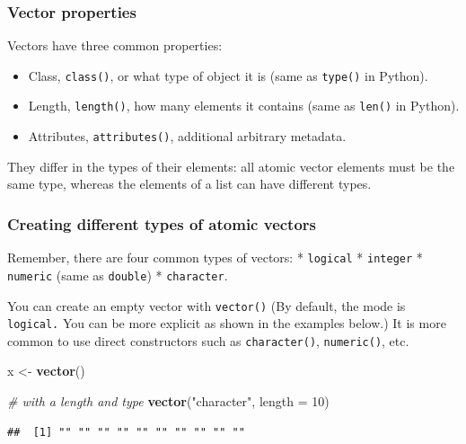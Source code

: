 \documentclass[
]{book}
\newenvironment{Shaded}{\begin{snugshade}}{\end{snugshade}}
\newcommand{\AttributeTok}[1]{\textcolor[rgb]{0.13,0.29,0.53}{#1}}
\newcommand{\CommentTok}[1]{\textcolor[rgb]{0.56,0.35,0.01}{\textit{#1}}}
\newcommand{\DecValTok}[1]{\textcolor[rgb]{0.00,0.00,0.81}{#1}}
\newcommand{\FunctionTok}[1]{\textcolor[rgb]{0.13,0.29,0.53}{\textbf{#1}}}
\newcommand{\NormalTok}[1]{#1}
\newcommand{\OtherTok}[1]{\textcolor[rgb]{0.56,0.35,0.01}{#1}}
\newcommand{\StringTok}[1]{\textcolor[rgb]{0.31,0.60,0.02}{#1}}
\providecommand{\tightlist}{%
  \setlength{\itemsep}{0pt}\setlength{\parskip}{0pt}}
\begin{document}
\subsubsection{Vector properties}\label{vector-properties}

Vectors have three common properties:

\begin{itemize}
\tightlist
\item
  Class, \texttt{class()}, or what type of object it is (same as \texttt{type()} in Python).
\item
  Length, \texttt{length()}, how many elements it contains (same as \texttt{len()} in Python).
\item
  Attributes, \texttt{attributes()}, additional arbitrary metadata.
\end{itemize}

They differ in the types of their elements: all atomic vector elements must be the same type, whereas the elements of a list can have different types.

\subsubsection{Creating different types of atomic vectors}\label{creating-different-types-of-atomic-vectors}

Remember, there are four common types of vectors:
* \texttt{logical}
* \texttt{integer}
* \texttt{numeric} (same as \texttt{double})
* \texttt{character}.

You can create an empty vector with \texttt{vector()} (By default, the mode is \texttt{logical.} You can be more explicit as shown in the examples below.) It is more common to use direct constructors such as \texttt{character()}, \texttt{numeric()}, etc.

\begin{Shaded}
\begin{Highlighting}[]
\NormalTok{x }\OtherTok{\textless{}{-}} \FunctionTok{vector}\NormalTok{()}

\CommentTok{\# with a length and type}
\FunctionTok{vector}\NormalTok{(}\StringTok{"character"}\NormalTok{, }\AttributeTok{length =} \DecValTok{10}\NormalTok{)}
\end{Highlighting}
\end{Shaded}

\begin{verbatim}
##  [1] "" "" "" "" "" "" "" "" "" ""
\end{verbatim}
\end{document}
